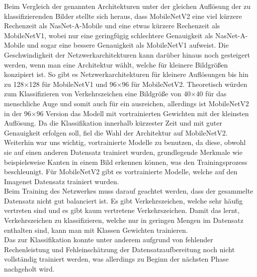 \documentclass[12pt,a4paper,ngerman,enabledeprecatedfontcommands]{scrreprt}
\begin{document}
Beim Vergleich der genannten Architekturen unter der gleichen Auflösung der zu klassifizierenden Bilder stellte sich heraus, dass MobileNetV2\cite{DBLP:journals/corr/abs-1801-04381} eine viel kürzere Rechenzeit als NasNet-A-Mobile und eine etwas kürzere Rechenzeit als MobileNetV1\cite{DBLP:journals/corr/HowardZCKWWAA17}, wobei nur eine geringfügig schlechtere Genauigkeit als NasNet-A-Mobile und sogar eine bessere Genauigkeit als MobileNetV1\cite{DBLP:journals/corr/HowardZCKWWAA17} aufweist.
Die Geschwindigkeit der Netzwerkarchitekturen kann darüber hinaus noch gesteigert werden, wenn man eine Architektur wählt, welche für kleinere Bildgrößen konzipiert ist. 
So gibt es Netzwerkarchitekturen für kleinere Auflösungen bis hin zu 128$\times$128 für MobileNetV1\cite{DBLP:journals/corr/HowardZCKWWAA17} und 96$\times$96 für MobileNetV2\cite{DBLP:journals/corr/abs-1801-04381}.
Theoretisch würden zum Klassifizieren von Verkehrszeichen eine Bildgröße von 40$\times$40 für das menschliche Auge und somit auch für ein  ausreichen, allerdings ist MobileNetV2\cite{DBLP:journals/corr/abs-1801-04381} in der 96$\times$96 Version das Modell mit vortrainierten Gewichten mit der kleinsten Auflösung.
Da die Klassifikation innerhalb kürzester Zeit und mit guter Genauigkeit erfolgen soll, fiel die Wahl der Architektur auf MobileNetV2\cite{DBLP:journals/corr/abs-1801-04381}.\\
Weiterhin war uns wichtig, vortrainierte Modelle zu benutzen, da diese, obwohl sie auf einen anderen Datensatz trainiert wurden, grundlegende Merkmale wie beispielsweise Kanten in einem Bild erkennen können, was den Trainingsprozess beschleunigt. Für MobileNetV2\cite{DBLP:journals/corr/abs-1801-04381} gibt es vortrainierte Modelle, welche auf den Imagenet Datensatz trainiert wurden.\\
Beim Training des Netzwerkes muss darauf geachtet werden, dass der gesammelte Datensatz nicht gut balanciert ist. Es gibt Verkehrszeichen, welche sehr häufig vertreten sind und es gibt kaum vertretene Verkehrszeichen.
Damit das  lernt, Verkehrszeichen zu klassifizieren, welche nur in geringen Mengen im Datensatz enthalten sind, kann man mit Klassen Gewichten trainieren.\\
Das  zur \gls{Klassifikation} konnte unter anderem aufgrund von fehlender Rechenleistung und Fehleinschätzung der Datensatzaufbereitung noch nicht vollständig trainiert werden, was allerdings zu Beginn der nächsten Phase nachgeholt wird.\\
\end{document}
